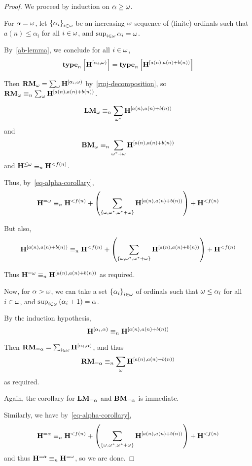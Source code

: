 \begin{proof}
    We proceed by induction on $\alpha \ge \omega$.

    For $\alpha = \omega$, let $\left\{ {\alpha_i} \right\}_{i \in \omega}$ be an increasing $\omega$-sequence of (finite) ordinals
    such that $a(n) \le \alpha_i$ for all $i \in \omega$, and $\sup_{i \in \omega} \alpha_i = \omega$.

    By~\cref{ab-lemma}, we conclude for all $i \in \omega$,
    \[
        \mathbf{type}_{n} \left[ {\mathbf{H}^{[\alpha_i, \omega)}} \right] = \mathbf{type}_{n} \left[ {\mathbf{H}^{[a(n), a(n) + b(n))}} \right]
    \]

    Then $\mathbf{RM}_{\omega} = \sum_{\omega} \mathbf{H}^{[\alpha_i, \omega)}$
    by~\cref{rmj-decomposition},
    so $\mathbf{RM}_{\omega} \equiv_n \sum_{\omega} \mathbf{H}^{[a(n), a(n) + b(n))}$.

    \[
        \mathbf{LM}_{\omega} \equiv_n \sum_{\omega^\ast} \mathbf{H}^{[a(n), a(n) + b(n))}
    \]
    and
    \[
        \mathbf{BM}_{\omega} \equiv_n \sum_{\omega^\ast + \omega} \mathbf{H}^{[a(n), a(n) + b(n))}
    \]
    and $\mathbf{H}^{\le \omega} \equiv_n \mathbf{H}^{< f(n)}$.

    Thus, by~\cref{eq-alpha-corollary},
    \[
        \mathbf{H}^{= \omega}  \equiv_n \mathbf{H}^{< f(n)} +
        \left( {\sum_{\left\{ {\omega, \omega^\ast, \omega^\ast + \omega} \right\}} \mathbf{H}^{[a(n), a(n) + b(n))}} \right)
        + \mathbf{H}^{< f(n)}
    \]

    But also,
    \[
        \mathbf{H}^{[a(n), a(n) + b(n))} \equiv_n \mathbf{H}^{< f(n)}
        + \left( {\sum_{\left\{ {\omega, \omega^\ast, \omega^\ast + \omega} \right\}} \mathbf{H}^{[a(n), a(n) + b(n))}} \right)
        + \mathbf{H}^{< f(n)}
    \]

    Thus $\mathbf{H}^{= \omega} \equiv_n \mathbf{H}^{[a(n), a(n) + b(n))}$ as required.

    Now, for $\alpha > \omega$, we can take a set $\left\{ {\alpha_i} \right\}_{i \in \omega}$ of ordinals
    such that $\omega \le \alpha_i$ for all $i \in \omega$,
    and $\sup_{i \in \omega} \left( {\alpha_i + 1} \right) = \alpha$.

    By the induction hypothesis,
    \[
        \mathbf{H}^{[\alpha_i, \alpha)} \equiv_n \mathbf{H}^{[a(n), a(n) + b(n))}
    \]

    Then $\mathbf{RM}_{= \alpha} = \sum_{i \in \omega} \mathbf{H}^{[\alpha_i, \alpha)}$,
    and thus \[
        \mathbf{RM}_{= \alpha} \equiv_n \sum_{\omega} \mathbf{H}^{[a(n), a(n) + b(n))}
    \]
    as required.

    Again, the corollary for $\mathbf{LM}_{= \alpha}$ and $\mathbf{BM}_{= \alpha}$
    is immediate.

    Similarly, we have by~\cref{eq-alpha-corollary},
    \[
        \mathbf{H}^{= \alpha} \equiv_n \mathbf{H}^{< f(n)}
        + \left( {\sum_{\left\{ {\omega, \omega^\ast, \omega^\ast + \omega} \right\}} \mathbf{H}^{[a(n), a(n) + b(n))}} \right)
        + \mathbf{H}^{< f(n)}
    \]
    and thus $\mathbf{H}^{= \alpha} \equiv_n \mathbf{H}^{= \omega}$,
    so we are done.
\end{proof}
